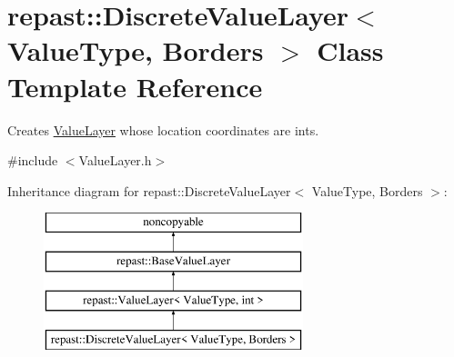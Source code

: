 \hypertarget{classrepast_1_1_discrete_value_layer}{\section{repast\-:\-:Discrete\-Value\-Layer$<$ Value\-Type, Borders $>$ Class Template Reference}
\label{classrepast_1_1_discrete_value_layer}
}


Creates \hyperlink{classrepast_1_1_value_layer}{Value\-Layer} whose location coordinates are ints.  




{\ttfamily \#include $<$Value\-Layer.\-h$>$}

Inheritance diagram for repast\-:\-:Discrete\-Value\-Layer$<$ Value\-Type, Borders $>$\-:\begin{figure}[H]
\begin{center}
\leavevmode
\includegraphics[height=4.000000cm]{classrepast_1_1_discrete_value_layer}
\end{center}
\end{figure}
